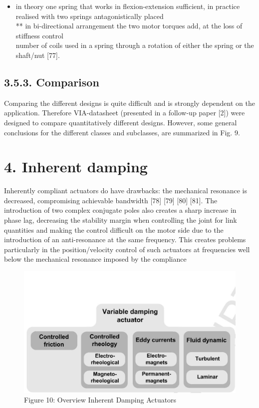 \documentclass[10pt]{article}
\begin{document}
\begin{itemize}
  \item in theory one spring that works in flexion-extension sufficient, in practice realised with two springs antagonistically placed\\
** in bi-directional arrangement the two motor torques add, at the loss of stiffness control\\[0pt]
number of coils used in a spring through a rotation of either the spring or the shaft/nut [77].
\end{itemize}

\subsection*{3.5.3. Comparison}
Comparing the different designs is quite difficult and is strongly dependent on the application. Therefore VIA-datasheet (presented in a follow-up paper [2]) were designed to compare quantitatively different designs. However, some general conclusions for the different classes and subclasses, are summarized in Fig. 9.

\section*{4. Inherent damping}
Inherently compliant actuators do have drawbacks: the mechanical resonance is decreased, compromising achievable bandwidth [78] [79] [80] [81]. The introduction of two complex conjugate poles also creates a sharp increase in phase lag, decreasing the stability margin when controlling the joint for link quantities and making the control difficult on the motor side due to the introduction of an anti-resonance at the same frequency. This creates problems particularly in the position/velocity control of such actuators at frequencies well below the mechanical resonance imposed by the compliance

\begin{figure}[h]
\begin{center}
  \includegraphics[width=\textwidth]{2025_09_17_f0417c8723605e4ad1efg-21}
\captionsetup{labelformat=empty}
\caption{Figure 10: Overview Inherent Damping Actuators}
\end{center}
\end{figure}
\end{document}
